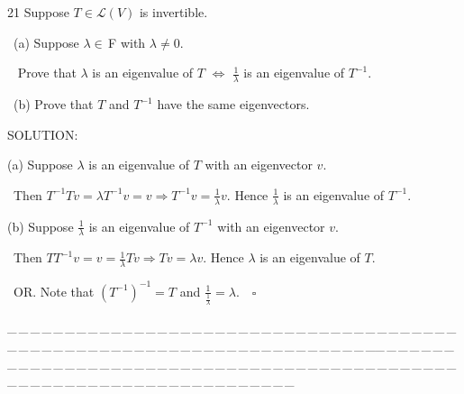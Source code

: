\documentclass[a4paper, 11pt, UTF8]{article}
\def\Lm{\mathcal{L}}
\def\Fbf{$\,{\timesbf F}\,$}
\begin{document}
\begin{large}
{\timesbf\Large 21} {\timessl\Large 
Suppose $T\in\Lm(V)$ is invertible.}\par\quad\,
(a) {\timessl\Large Suppose $\lambda\in\Fbf\,$with $\lambda\neq 0$.}\par\qquad\,\,\,
{\timessl\Large Prove that $\lambda$ is an eigenvalue of $T$ $\Longleftrightarrow$ $\frac{1}{\lambda}$ is an eigenvalue of $T^{-1}$.}\par\quad\,
(b) {\timessl\Large Prove that $T$ and $T^{-1}$ have the same eigenvectors.
}\par
{\timesbf S\footnotesize{OLUTION:}}\par\quad
(a) Suppose $\lambda$ is an eigenvalue of $T$ with an eigenvector $v.$\par\qquad\,
Then $T^{-1}Tv=\lambda T^{-1}v=v\Rightarrow T^{-1}v=\frac{1}{\lambda}v.$ Hence $\frac{1}{\lambda}$ is an eigenvalue of $T^{-1}.$\par\quad
(b) Suppose $\frac{1}{\lambda}$ is an eigenvalue of $T^{-1}$ with an eigenvector $v.$\par\qquad\,
Then $TT^{-1}v=v=\frac{1}{\lambda}Tv\Rightarrow Tv=\lambda v.$ Hence $\lambda$ is an eigenvalue of $T.$\par\qquad\,
O{\small R.} Note that $(T^{-1})^{-1}=T$ and $\frac{1}{\frac{1}{\lambda}}=\lambda.\quad\square$\par
{\tiny \_\,\_\,\_\,\_\,\_\,\_\,\_\,\_\,\_\,\_\,\_\,\_\,\_\,\_\,\_\,\_\,\_\,\_\,\_\,\_\,\_\,\_\,\_\,\_\,\_\,\_\,\_\,\_\,\_\,\_\,\_\,\_\,\_\,\_\,\_\,\_\,\_\,\_\,\_\,\_\,\_\,\_\,\_\,\_\,\_\,\_\,\_\,\_\,\_\,\_\,\_\,\_\,\_\,\_\,\_\,\_\,\_\,\_\,\_\,\_\,\_\,\_\,\_\,\_\,\_\,\_\,\_\,\_\,\_\,\_\,\_\_\,\_\,\_\,\_\,\_\,\_\,\_\,\_\,\_\,\_\,\_\,\_\,\_\,\_\,\_\,\_\,\_\,\_\,\_\,\_\,\_\,\_\,\_\,\_\,\_\,\_\,\_\,\_\,\_\,\_\,\_\,\_\,\_\,\_\,\_\,\_\,\_\,\_\,\_\,\_\,\_\,\_\,\_\,\_\,\_\,\_\,\_\,\_\,\_\,\_\,\_\,\_\,\_\,\_\,\_\,\_\,\_\,\_\,\_\,\_\,\_\,\_\,\_\,\_\,\_\,\_\,\_\,\_\,\_\,\_\,\_}\par


\end{large}
\end{document}
